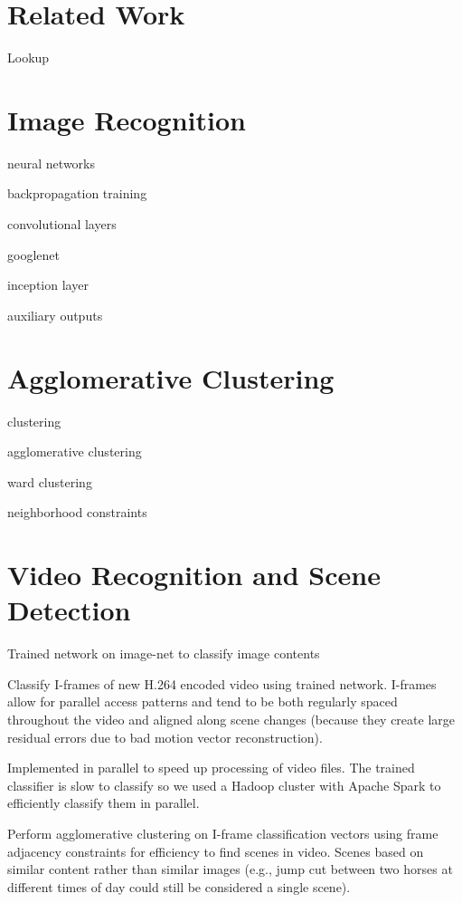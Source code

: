 \documentclass{article}
\begin{document}
\section{Related Work}
\label{sec:format}

Lookup

\section{Image Recognition}

neural networks

backpropagation training

convolutional layers

googlenet

inception layer

auxiliary outputs

\section{Agglomerative Clustering}

clustering

agglomerative clustering

ward clustering

neighborhood constraints

\section{Video Recognition and Scene Detection}

Trained network on image-net to classify image contents

Classify I-frames of new H.264 encoded video using trained network.
I-frames allow for parallel access patterns and tend to be both regularly
spaced throughout the video and aligned along scene changes (because
they create large residual errors due to bad motion vector reconstruction).

Implemented in parallel to speed up processing of video files. The
trained classifier is slow to classify so we used a Hadoop cluster
with Apache Spark to efficiently classify them in parallel.

Perform agglomerative clustering on I-frame classification vectors
using frame adjacency constraints for efficiency to find scenes in
video. Scenes based on similar content rather than similar images
(e.g., jump cut between two horses at different times of day could
still be considered a single scene).
\end{document}
